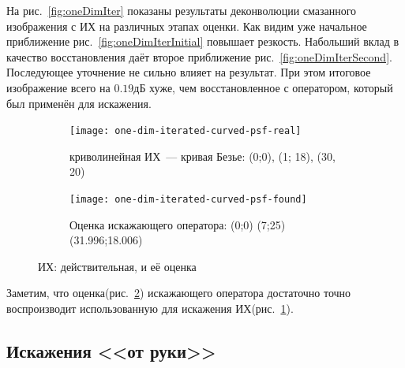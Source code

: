 На рис.~\ref{fig:oneDimIter} показаны результаты деконволюции смазанного изображения с ИХ на различных этапах оценки. Как видим уже начальное приближение рис.~\ref{fig:oneDimIterInitial} повышает резкость. Набольший вклад в качество восстановления даёт второе приближение рис.~\ref{fig:oneDimIterSecond}. Последующее уточнение не сильно влияет на результат. При этом итоговое изображение всего на $0.19$дБ хуже, чем восстановленное с оператором, который был применён для искажения.

\begin{figure}[h!]
	\centering
	\begin{subfigure}[t]{0.475\textwidth}
		\centering
		\texttt{[image: one-dim-iterated-curved-psf-real]}
		\caption{криволинейная ИХ~--- кривая Безье: (0;0), (1; 18), (30, 20)}
		\label{fig:oneDimIterPsfTrue}
	\end{subfigure}
	\hfill
	\begin{subfigure}[t]{0.475\textwidth}
		\centering
		\texttt{[image: one-dim-iterated-curved-psf-found]}
		\caption{Оценка искажающего оператора: (0;0) (7;25) (31.996;18.006)}
		\label{fig:oneDimIterPsfFound}
	\end{subfigure}
	\caption{ИХ: действительная, и её оценка}
	\label{fig:oneDimIterPsf}
\end{figure}

Заметим, что оценка(рис.~\ref{fig:oneDimIterPsfFound}) искажающего оператора достаточно точно воспроизводит использованную для искажения ИХ(рис.~\ref{fig:oneDimIterPsfTrue}).

\subsection{Искажения <<от руки>>}

